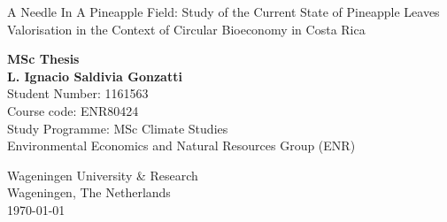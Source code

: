 \begin{titlepage}

\vspace*{2cm}
\centering
\begin{Large}\bfseries

A Needle In A Pineapple Field: Study of the Current State of Pineapple Leaves Valorisation in the Context of Circular Bioeconomy in Costa Rica

\end{Large}

\vspace{2cm}

\begin{center}%

\textbf{MSc Thesis} \\ \vspace{2cm}
\textbf{L. Ignacio Saldivia Gonzatti} \\ \vspace{0.25cm}
 Student Number: 1161563 \\ \vspace{0.25cm}
Course code: ENR80424\\  \vspace{0.25cm}
Study Programme: MSc Climate Studies \\ \vspace{0.25cm}
Environmental Economics and Natural Resources Group (ENR)  \vspace{0.25cm}


       \vfill
            
            
        Wageningen University \& Research\\
        Wageningen, The Netherlands\\
       \today

\end{center}
\end{titlepage}
